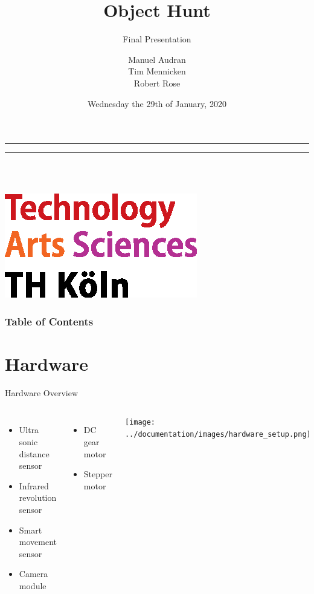 \documentclass{beamer}
\title{Object Hunt}
\subtitle{Final Presentation}
\author[Manuel Audran, Tim Mennicken, Robert Rose]{Manuel Audran\\ Tim Mennicken\\ Robert Rose}
\institute[TH Köln]{University of Applied Sciences Cologne}
\date[29.01.2020] %
{Wednesday the 29th of January, 2020}
\begin{document}
\bgroup
\makeatletter
{}
{
	\leavevmode
    \begin{beamercolorbox}[wd=0.125\paperwidth,dp=1pt]{}
    \end{beamercolorbox}%
    \begin{beamercolorbox}[wd=0.875\paperwidth,dp=0ex]{}
    \hrule
    \vspace{0.1mm}
    \hrule
    \vspace{1mm}
    \parbox[b]{0.3\paperwidth}{\inserttitle\\[1.5mm] \insertshortauthor\\ \insertshortdate}
    \hfill
    \includegraphics[width=0.12\paperwidth]{sources/logo_TH-Koeln_CMYK_22pt}
    \hspace{2mm}
    \vspace{1mm}
    \end{beamercolorbox}%
}
\makeatother
\begin{frame}
\titlepage
\end{frame}
\egroup

\setcounter{framenumber}{0}

\begin{frame}
\frametitle{Table of Contents}
\tableofcontents
\end{frame} 
 
\section{Hardware}

\begin{frame}{Hardware Overview}
\begin{columns}
\begin{itemize}
\item Ultra sonic distance sensor
\item Infrared revolution sensor
\item Smart movement sensor
\item Camera module
\end{itemize}
\vspace{5mm}
\begin{itemize}
\item<2-> DC gear motor
\item<2-> Stepper motor
\end{itemize}
 
\texttt{[image: ../documentation/images/hardware\_setup.png]}
\end{columns}
\end{frame}
\end{document}
